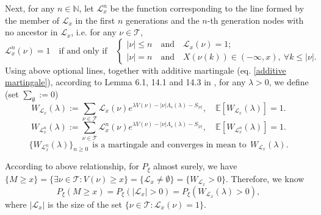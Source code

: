 \documentclass[]{article}
\numberwithin{equation}{section}
\theoremstyle{thmstyleone}%
\theoremstyle{thmstyletwo}%
\theoremstyle{thmstylethree}%
\theoremstyle{thmstylefour}%
\theoremstyle{thmstylefive}%
\theoremstyle{thmstylesix}%
\newcommand{\N}{\mathbb{N}}
\newcommand{\E}{\mathbb{E}}
\begin{document}
	Next, for any $n\in \N$, let $\mathcal{L}_x^n$ be the function corresponding to the line
	formed by the member of $\mathcal{L}_x$ 
	in the first $n$ generations and the $n$-th generation nodes 
	with no ancestor in $\mathcal{L}_x$, i.e. for any $ \nu\in \mathcal{T} $, \begin{equation}\label{Lnx}\mathcal{L}_x^n(\nu) = 1 \quad\text{if and only if}\quad \begin{cases*}
			|\nu|\leqslant n\quad \text{and} \quad \mathcal{L}_x(\nu) = 1;
			\\
			|\nu| = n \quad\text{and} \quad  X(\nu(k)) \in (-\infty,x), ~\forall k \leqslant |\nu|.
	\end{cases*} \end{equation}
	Using above optional lines, together with additive martingale (eq. \eqref{additive martingale}),
	according to Lemma 6.1, 14.1 and 14.3 in \cite{Biggins2004},
	for any $\lambda>0$, we define (set $\sum_{\emptyset} := 0 $)
	\begin{equation}\label{optional line}
		W_{\mathcal{L}_x}(\lambda)
		:=
		\sum\limits_{\nu\in \mathcal{T}} 
		\mathcal{L}_x(\nu) e^{\lambda V(\nu)-\left|\nu\right|\Lambda_s(\lambda)-S_{|\nu|}}, \quad \E[W_{\mathcal{L}_x}(\lambda)] = 1.
	\end{equation}
	\begin{equation}\label{optional line martingale}
		W_{\mathcal{L}_x^n}(\lambda)
		:=
		\sum\limits_{\nu\in \mathcal{T}} 
		\mathcal{L}^n_x(\nu)
		e^{\lambda V(\nu)-\left|\nu\right|\Lambda_s(\lambda)-S_{|\nu|}},\quad
		\E[W_{\mathcal{L}_x^n}(\lambda)] = 1.
	\end{equation}
	\begin{equation}\label{martingale l1 convergence}
		\{W_{\mathcal{L}_x^n}(\lambda)\}_{n\geqslant 0}~~
		\text{is a martingale and converges in mean to}~~
		W_{\mathcal{L}_x}(\lambda).
	\end{equation}
	
	According to above relationship, for $P_\xi$ almost surely, we have
	$\{M\geqslant x\} = \{\exists \nu\in \mathcal{T}:V(\nu)\geqslant x\} = \{\mathcal{L}_x\neq \emptyset\} = \{W_{\mathcal{L}_x}>0\}.$ Therefore, we know
	\begin{equation}\label{tail probability equality relation}
		P_\xi(M\geqslant x) = P_\xi(|\mathcal{L}_x|>0) = P_\xi\left(W_{\mathcal{L}_x}(\lambda)>0\right),
	\end{equation}
	where $|\mathcal{L}_x|$ is the size of the set $\{\nu\in \mathcal{T} :\mathcal{L}_x(\nu) = 1\}$.
	
\end{document}
